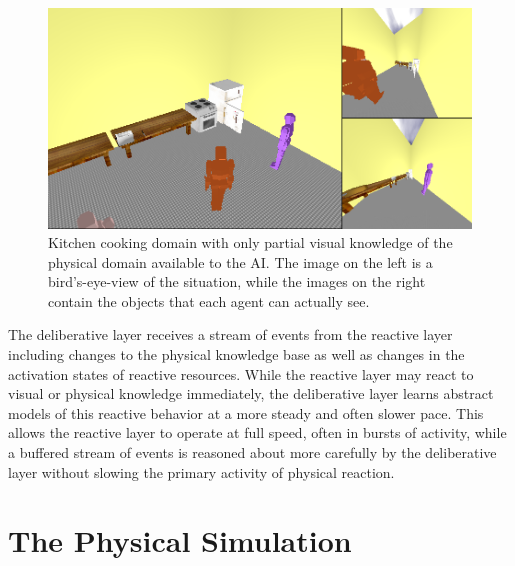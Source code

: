 \begin{figure}
\begin{center}
\includegraphics[width=12cm]{gfx/isis_world_two_agents}
\end{center}
\caption[Kitchen cooking domain with partial visual knowledge of the
  physical domain.]{Kitchen cooking domain with only partial visual
  knowledge of the physical domain available to the AI.  The image on
  the left is a bird's-eye-view of the situation, while the images on
  the right contain the objects that each agent can actually see.}
\label{figure:isis_world_two_agents}
\end{figure}

The deliberative layer receives a stream of events from the reactive
layer including changes to the physical knowledge base as well as
changes in the activation states of reactive resources.  While the
reactive layer may react to visual or physical knowledge immediately,
the deliberative layer learns abstract models of this reactive
behavior at a more steady and often slower pace.  This allows the
reactive layer to operate at full speed, often in bursts of activity,
while a buffered stream of events is reasoned about more carefully by
the deliberative layer without slowing the primary activity of
physical reaction.

\section{The Physical Simulation}

